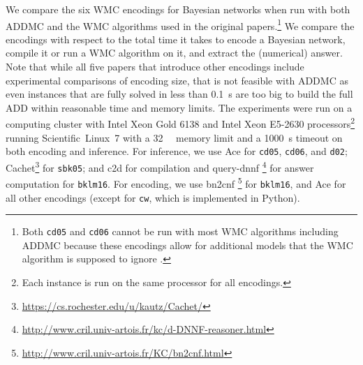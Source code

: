 \documentclass{uai2021} %
\theoremstyle{definition}
\begin{document}

We compare the six WMC encodings for Bayesian networks when run with both
\textsf{ADDMC} and the WMC algorithms used in the original papers.\footnote{Both
  \texttt{cd05} and \texttt{cd06} cannot be run with most WMC algorithms
  including \textsf{ADDMC} because these encodings allow for additional models
  that the WMC algorithm is supposed to ignore
  \citep{DBLP:conf/ijcai/ChaviraD05,DBLP:conf/sat/ChaviraD06}.} We compare the
encodings with respect to the total time it takes to encode a Bayesian network,
compile it or run a WMC algorithm on it, and extract the (numerical) answer.
Note that while all five papers that introduce other encodings include
experimental comparisons of encoding size, that is not feasible with
\textsf{ADDMC} as even instances that are fully solved in less than
\SI{0.1}{\second} are too big to build the full ADD within reasonable time and
memory limits. The experiments were run on a computing cluster with Intel Xeon
Gold 6138 and Intel Xeon E5-2630 processors\footnote{Each instance is run on the
  same processor for all encodings.} running Scientific~Linux~7 with a
\SI{32}{\gibi\byte} memory limit and a \SI{1000}{\second} timeout on both
encoding and inference. For inference, we use \textsf{Ace} for \texttt{cd05},
\texttt{cd06}, and \texttt{d02};
\textsf{Cachet}\footnote{\url{https://cs.rochester.edu/u/kautz/Cachet/}}
\citep{DBLP:conf/sat/SangBBKP04} for \texttt{sbk05}; and \textsf{c2d}
\citep{DBLP:conf/ecai/Darwiche04} for compilation and \textsf{query-dnnf}
\footnote{\url{http://www.cril.univ-artois.fr/kc/d-DNNF-reasoner.html}} for
answer computation for \texttt{bklm16}. For encoding, we use \textsf{bn2cnf}
\footnote{\url{http://www.cril.univ-artois.fr/KC/bn2cnf.html}} for
\texttt{bklm16}, and \textsf{Ace} for all other encodings (except for
\texttt{cw}, which is implemented in Python).
\end{document}
